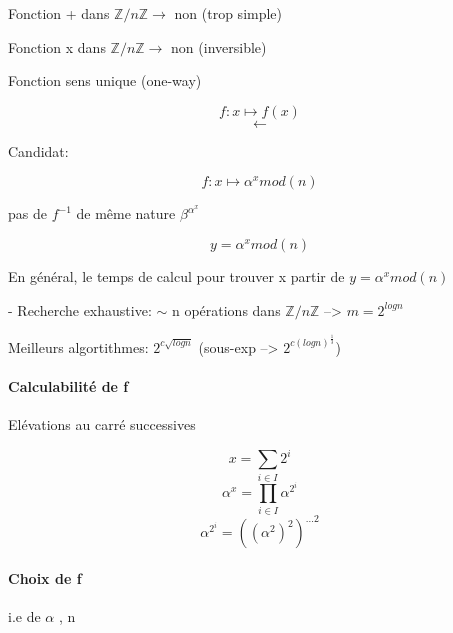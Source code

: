 \documentclass[12pt,a4paper]{article}
\begin{document}
Fonction + dans $\mathbb{Z} /n\mathbb{Z} \rightarrow$ non (trop simple)

Fonction x dans $\mathbb{Z} /n\mathbb{Z} \rightarrow$ non (inversible)



Fonction  sens unique (one-way)

\begin{displaymath}
f:x \longmapsto f(x)
\end{displaymath}
\begin{displaymath}
\longleftarrow
\end{displaymath}

Candidat:

\begin{displaymath}
f: x \longmapsto \alpha ^ x mod (n)
\end{displaymath}

pas de $f^{-1}$ de même nature $\beta^{\alpha^x}$

\begin{displaymath}
y = \alpha^x mod (n)
\end{displaymath}

En général, le temps de calcul pour trouver x  partir de $y=\alpha^x mod (n)$ 

- Recherche exhaustive: $\sim$ n opérations dans $\mathbb{Z}/n\mathbb{Z}$ --> $m=2^{log n}$


Meilleurs algortithmes: $2^{c \sqrt{log n}}$ 
(sous-exp --> $2^{c(log n)^{\frac{1}{3}}}$)

\paragraph{Calculabilité de f}

Elévations au carré successives

\begin{displaymath}
x=\sum_{i\in I} 2^i
\end{displaymath}
\begin{displaymath}
\alpha ^x = \prod _{i \in I} \alpha ^{2^i}
\end{displaymath}
\begin{displaymath}
\alpha^{2^i} = ((\alpha ^2)^2)^{...2}
\end{displaymath}

\paragraph{Choix de f} i.e de $\alpha$ , n
\end{document}
